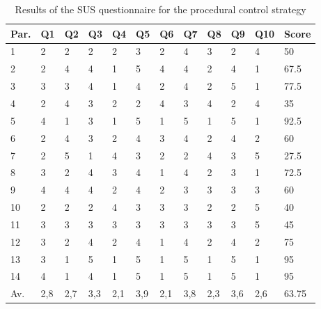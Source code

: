 \documentclass[10pt, conference]{IEEEtran}
\begin{document}
\begin{table}[]
\begin{tabular}{m{1em} m{1em} m{1em} m{1em} m{1em} m{1em} m{1em} m{1em} m{1em} m{1em} m{1em} m{3em}}
\hline
Par.    & Q1 & Q2 & Q3 & Q4 & Q5 & Q6 & Q7 & Q8 & Q9 & Q10 & Score \\
\hline
1       & 2   & 2   & 2   & 2   & 3   & 2   & 4   & 3   & 2   & 4    & 50      \\
2       & 2   & 4   & 4   & 1   & 5   & 4   & 4   & 2   & 4   & 1    & 67.5    \\
3       & 3   & 3   & 4   & 1   & 4   & 2   & 4   & 2   & 5   & 1    & 77.5    \\
4       & 2   & 4   & 3   & 2   & 2   & 4   & 3   & 4   & 2   & 4    & 35      \\
5       & 4   & 1   & 3   & 1   & 5   & 1   & 5   & 1   & 5   & 1    & 92.5    \\
6       & 2   & 4   & 3   & 2   & 4   & 3   & 4   & 2   & 4   & 2    & 60      \\
7       & 2   & 5   & 1   & 4   & 3   & 2   & 2   & 4   & 3   & 5    & 27.5 \\
8       & 3   & 2   & 4   & 3   & 4   & 1   & 4   & 2   & 3   & 1    & 72.5    \\
9       & 4   & 4   & 4   & 2   & 4   & 2   & 3   & 3   & 3   & 3    & 60      \\
10      & 2   & 2   & 2   & 4   & 3   & 3   & 3   & 2   & 2   & 5    & 40      \\
11      & 3   & 3   & 3   & 3   & 3   & 3   & 3   & 3   & 3   & 5    & 45      \\
12      & 3   & 2   & 4   & 2   & 4   & 1   & 4   & 2   & 4   & 2    & 75      \\
13      & 3   & 1   & 5   & 1   & 5   & 1   & 5   & 1   & 5   & 1    & 95      \\
14      & 4   & 1   & 4   & 1   & 5   & 1   & 5   & 1   & 5   & 1    & 95      \\
    \hline
Av. & 2,8 & 2,7 & 3,3 & 2,1 & 3,9 & 2,1 & 3,8 & 2,3 & 3,6 & 2,6  & 63.75  \\
    \hline
\end{tabular}
\caption{Results of the SUS questionnaire for the procedural control strategy}
\label{SUS_answers_proc}
\end{table}
\end{document}
